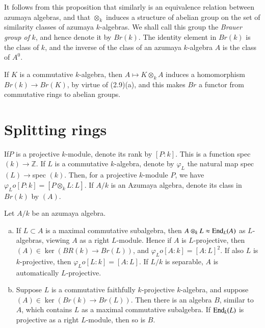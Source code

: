 It follows from this proposition that similarly is an equivalence
relation between azumaya algebras, and that $\otimes_k$ induces a
structure of abelian group on the set of similarity classes of azumaya
$k$-algebras. We shall call this  group the \textit{Brauer group of}
$k$, and hence denote it by $Br(k)$. The identity element in $Br(k)$
is the class of $k$, and the inverse of the class of an azumaya
$k$-algebra $A$ is the class of $A^0$. 
         
If $K$ is a commutative $k$-algebra, then $A \mapsto K \otimes_k A$
induces a homomorphism $Br(k) \to Br(K)$, by virtue of (2.9)(a), and
this makes $Br$ a functor from commutative rings to abelian groups. 
         

\section{Splitting rings}\label{chap3:sec5} %
         
If\pageoriginale $P$ is a projective $k$-module, denote its rank by
$[P : k]$. This 
is a function spec $(k) \to \mathbb{Z}$. If $L$ is a commutative
$k$-algebra, denote by $\varphi_L$ the natural map spec $(L) \to $spec
$(k)$. Then, for a projective $k$-module $P$, we have $\varphi_L o
[P:k]= [P \otimes_k L : L]$. If  $A/k$ is an Azumaya algebra, denote
its class in $Br(k)$ by  $(A)$. 

\begin{theorem} %
Let $A/k$ be an azumaya algebra.
\begin{enumerate}[(a)]
\item If $L \subset A$ is a maximal commutative subalgebra,
  then $A \otimes_k L  \approx \operatorname{End}_L (A)$ as $L$-algebras, viewing
  $A$ as a right $L$-module. Hence if  $A$ is $L$-projective, then
  $(A) \in \ker (BR(k) \to Br (L))$, and $\varphi_L o [A : k] = [A :
    L]^2$. If also $L$ is $k$-projective, then $\varphi_L o  [L :k] =
  [A : L]$. If $L/k$ is separable, $A$ is automatically
  $L$-projective. 

\item Suppose $L$ is a commutative faithfully $k$-projective
  $k$-algebra, and suppose $(A) \in \ker (Br (k) \to  Br (L))$. Then
  there is an algebra $B$, similar to $A$, which contains $L$ as a
  maximal commutative subalgebra. If $\operatorname{End}_k (L)$ is projective as a
  right $L$-module, then so is $B$. 
\end{enumerate}     
\end{theorem}

